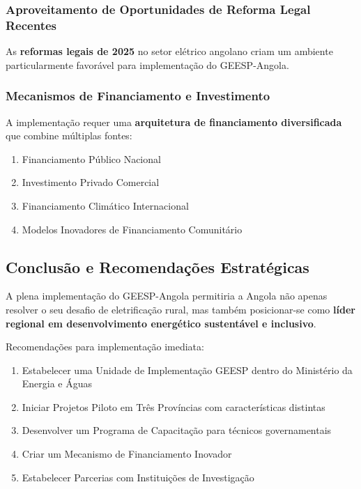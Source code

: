 \documentclass[12pt, a4paper]{article}
\begin{document}
\subsubsection{Aproveitamento de Oportunidades de Reforma Legal Recentes}

As \textbf{reformas legais de 2025} no setor elétrico angolano criam um ambiente particularmente favorável para implementação do GEESP-Angola.

\subsubsection{Mecanismos de Financiamento e Investimento}

A implementação requer uma \textbf{arquitetura de financiamento diversificada} que combine múltiplas fontes:
\begin{enumerate}
\item Financiamento Público Nacional
\item Investimento Privado Comercial
\item Financiamento Climático Internacional
\item Modelos Inovadores de Financiamento Comunitário
\end{enumerate}

\subsection{Conclusão e Recomendações Estratégicas}

A plena implementação do GEESP-Angola permitiria a Angola não apenas resolver o seu desafio de eletrificação rural, mas também posicionar-se como \textbf{líder regional em desenvolvimento energético sustentável e inclusivo}.

Recomendações para implementação imediata:
\begin{enumerate}
\item Estabelecer uma Unidade de Implementação GEESP dentro do Ministério da Energia e Águas
\item Iniciar Projetos Piloto em Três Províncias com características distintas
\item Desenvolver um Programa de Capacitação para técnicos governamentais
\item Criar um Mecanismo de Financiamento Inovador
\item Estabelecer Parcerias com Instituições de Investigação
\end{enumerate}

\end{document}
